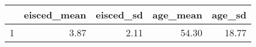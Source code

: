 \begin{table}[ht]
\centering
\begin{tabular}{rrrrr}
  \hline
 & eisced\_mean & eisced\_sd & age\_mean & age\_sd \\ 
  \hline
1 & 3.87 & 2.11 & 54.30 & 18.77 \\ 
   \hline
\end{tabular}
\end{table}
